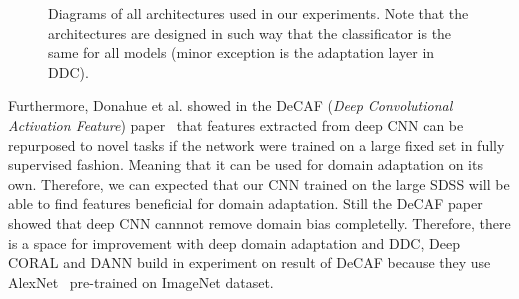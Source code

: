 \begin{figure}
\begin{center}
{
\label{drcn_architecture}
}
\end{center}
\caption[Architectures of deep domain adaptation model from experiments]{
	Diagrams of all architectures used in our experiments.
	Note that the architectures are designed in such way
	that the classificator is the same for all models
	(minor exception is the adaptation layer in DDC).
	}
\end{figure}

Furthermore, Donahue et al. showed in the DeCAF (\textit{Deep Convolutional Activation Feature}) paper~\cite{donahue2014}
that features extracted from deep CNN can be repurposed to novel tasks
if the network were trained on a large fixed set in fully supervised fashion.
Meaning that it can be used for domain adaptation on its own.
Therefore, we can expected that our CNN trained on the large SDSS
will be able to find features beneficial for domain adaptation.
Still the DeCAF paper showed that
deep CNN cannnot remove domain bias completelly.
Therefore, there is a space for improvement with deep domain adaptation
and DDC, Deep CORAL and DANN build in experiment on result of DeCAF
because they use AlexNet~\cite{krizhevsky2012} pre-trained on ImageNet dataset.

